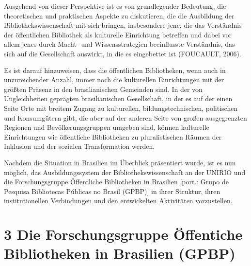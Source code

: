 \documentclass[a4paper,
fontsize=11pt,
oneside,
numbers=noperiodatend,
parskip=half-,
bibliography=totoc,
final
]{scrartcl}
\begin{document}
Ausgehend von dieser Perspektive ist es von grundlegender Bedeutung, die
theoretischen und praktischen Aspekte zu diskutieren, die die Ausbildung
der Bibliothekswissenschaft mit sich bringen, insbesondere jene, die das
Verständnis der öffentlichen Bibliothek als kulturelle Einrichtung
betreffen und dabei vor allem jenes durch Macht- und Wissensstrategien
beeinflusste Verständnis, das sich auf die Gesellschaft auswirkt, in die
es eingebettet ist (FOUCAULT, 2006).

Es ist darauf hinzuweisen, dass die öffentlichen Bibliotheken, wenn auch
in unzureichender Anzahl, immer noch die kulturellen Einrichtungen mit
der größten Präsenz in den brasilianischen Gemeinden sind. In der von
Ungleichheiten geprägten brasilianischen Gesellschaft, in der es auf der
einen Seite Orte mit breitem Zugang zu kulturellen, bildungstechnischen,
politischen und Konsumgütern gibt, die aber auf der anderen Seite von
großen ausgegrenzten Regionen und Bevölkerungsgruppen umgeben sind,
können kulturelle Einrichtungen wie öffentliche Bibliotheken zu
pluralistischen Räumen der Inklusion und der sozialen Transformation
werden.

Nachdem die Situation in Brasilien im Überblick präsentiert wurde, ist
es nun möglich, das Ausbildungssystem der Bibliothekswissenschaft an der
UNIRIO und die Forschungsgruppe Öffentliche Bibliotheken in Brasilien
{[}port.: Grupo de Pesquisa Bibliotecas Públicas no Brasil (GPBP){]} in
ihrer Struktur, ihren institutionellen Verbindungen und den entwickelten
Aktivitäten vorzustellen.

\hypertarget{die-forschungsgruppe-uxf6ffentiche-bibliotheken-in-brasilien-gpbp}{%
\section{3 Die Forschungsgruppe Öffentiche Bibliotheken in
Brasilien
(GPBP)}\label{die-forschungsgruppe-uxf6ffentiche-bibliotheken-in-brasilien-gpbp}}
\end{document}
